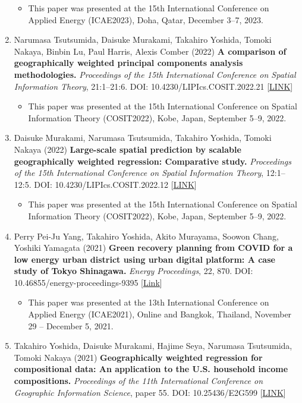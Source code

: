 \documentclass[
]{book}
\providecommand{\tightlist}{%
  \setlength{\itemsep}{0pt}\setlength{\parskip}{0pt}}
\begin{document}
\begin{enumerate}
  \begin{itemize}
  \tightlist
  \item
    This paper was presented at the 15th International Conference on Applied Energy (ICAE2023), Doha, Qatar, December 3--7, 2023.
  \end{itemize}
\item
  Narumasa Tsutsumida, Daisuke Murakami, Takahiro Yoshida, Tomoki Nakaya, Binbin Lu, Paul Harris, Alexis Comber (2022)
  \textbf{A comparison of geographically weighted principal components analysis methodologies.}
  \emph{Proceedings of the 15th International Conference on Spatial Information Theory}, 21:1--21:6.
  DOI: 10.4230/LIPIcs.COSIT.2022.21 {[}\href{https://doi.org/10.4230/LIPIcs.COSIT.2022.21}{LINK}{]}

  \begin{itemize}
  \tightlist
  \item
    This paper was presented at the 15th International Conference on Spatial Information Theory (COSIT2022), Kobe, Japan, September 5--9, 2022.
  \end{itemize}
\item
  Daisuke Murakami, Narumasa Tsutsumida, Takahiro Yoshida, Tomoki Nakaya (2022)
  \textbf{Large-scale spatial prediction by scalable geographically weighted regression: Comparative study.}
  \emph{Proceedings of the 15th International Conference on Spatial Information Theory}, 12:1--12:5.
  DOI: 10.4230/LIPIcs.COSIT.2022.12 {[}\href{https://doi.org/10.4230/LIPIcs.COSIT.2022.12}{LINK}{]}

  \begin{itemize}
  \tightlist
  \item
    This paper was presented at the 15th International Conference on Spatial Information Theory (COSIT2022), Kobe, Japan, September 5--9, 2022.
  \end{itemize}
\item
  Perry Pei-Ju Yang, Takahiro Yoshida, Akito Murayama, Soowon Chang, Yoshiki Yamagata (2021)
  \textbf{Green recovery planning from COVID for a low energy urban district using urban digital platform: A case study of Tokyo Shinagawa.}
  \emph{Energy Proceedings}, 22, 870.
  DOI: 10.46855/energy-proceedings-9395 {[}\href{https://doi.org/10.46855/energy-proceedings-9395}{Link}{]}

  \begin{itemize}
  \tightlist
  \item
    This paper was presented at the 13th International Conference on Applied Energy (ICAE2021), Online and Bangkok, Thailand, November 29 -- December 5, 2021.
  \end{itemize}
\item
  Takahiro Yoshida, Daisuke Murakami, Hajime Seya, Narumasa Tsutsumida, Tomoki Nakaya (2021)
  \textbf{Geographically weighted regression for compositional data: An application to the U.S. household income compositions.}
  \emph{Proceedings of the 11th International Conference on Geographic Information Science}, paper 55.
  DOI: 10.25436/E2G599 {[}\href{https://escholarship.org/uc/item/62s7n79k}{LINK}{]}


\end{enumerate}
\end{document}
